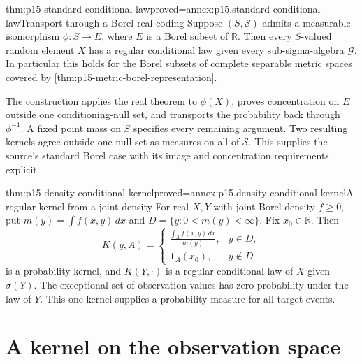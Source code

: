 \begin{hbtheorem}{thm:p15-standard-conditional-law}{proved=annex:p15.standard-conditional-law}{Transport through a Borel real coding}
Suppose \((S,\mathcal S)\) admits a measurable isomorphism
\(\phi:S\to E\), where \(E\) is a Borel subset of \(\mathbb R\).
Then every \(S\)-valued random element \(X\) has a regular conditional
law given every sub-sigma-algebra \(\mathcal G\).
In particular this holds for the Borel subsets of complete separable
metric spaces covered by \cref{thm:p15-metric-borel-representation}.

The construction applies the real theorem to \(\phi(X)\), proves
concentration on \(E\) outside one conditioning-null set, and transports
the probability back through \(\phi^{-1}\). A fixed point mass on \(S\)
specifies every remaining argument. Two resulting kernels agree outside
one null set as measures on all of \(\mathcal S\).
This supplies the source's standard Borel case with its image and
concentration requirements explicit.
\end{hbtheorem}

\begin{hbtheorem}{thm:p15-density-conditional-kernel}{proved=annex:p15.density-conditional-kernel}{A regular kernel from a joint density}
For real \(X,Y\) with joint Borel density \(f\geq0\), put
\(m(y)=\int f(x,y)\,dx\) and \(D=\{y:0<m(y)<\infty\}\).
Fix \(x_0\in\mathbb R\). Then
\[
 K(y,A)=
 \begin{cases}
  \displaystyle\frac{\int_Af(x,y)\,dx}{m(y)},&y\in D,\\
  \mathbf1_A(x_0),&y\notin D
 \end{cases}
\]
is a probability kernel, and \(K(Y,\cdot)\) is a regular conditional
law of \(X\) given \(\sigma(Y)\).
The exceptional set of observation values has zero probability under
the law of \(Y\). This one kernel supplies a probability measure for
all target events.
\end{hbtheorem}

\section{A kernel on the observation space}
\label{sec:p15-observation-kernel}

